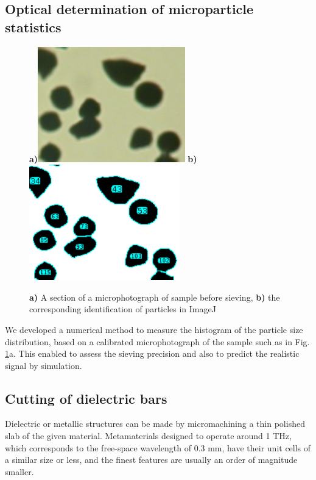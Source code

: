 \subsection{Optical determination of microparticle statistics}
\begin{figure}[ht] \caption{\textbf{a)} A section of a microphotograph of sample before sieving, \textbf{b)} the corresponding identification of particles in ImageJ} \label{fg_sievingstats} \centering 
\textbf{a)}\includegraphics[height=5cm]{img/technology/imagej_photo.pdf}
\textbf{b)}\includegraphics[height=5cm]{img/technology/imagej_found.pdf}
\end{figure}

We developed a numerical method to measure the histogram of the particle size distribution, based on a calibrated microphotograph of the sample such as in Fig. \ref{fg_sievingstats}a. This enabled to assess the sieving precision and also to predict the realistic signal by simulation.

\subsection{Cutting of dielectric bars}%
Dielectric or metallic structures can be made by micromachining a thin polished slab of the given material. Metamaterials designed to operate around 1 THz, which corresponds to the free-space wavelength of 0.3 mm, have their unit cells of a similar size or less, and the finest features are usually an order of magnitude smaller. 

